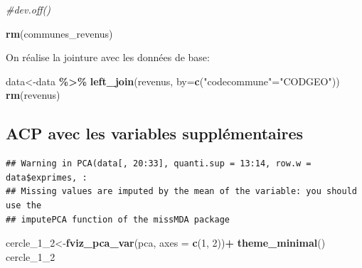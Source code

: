 \documentclass[
]{book}
\newenvironment{Shaded}{\begin{snugshade}}{\end{snugshade}}
\newcommand{\AttributeTok}[1]{\textcolor[rgb]{0.13,0.29,0.53}{#1}}
\newcommand{\CommentTok}[1]{\textcolor[rgb]{0.56,0.35,0.01}{\textit{#1}}}
\newcommand{\ConstantTok}[1]{\textcolor[rgb]{0.56,0.35,0.01}{#1}}
\newcommand{\DecValTok}[1]{\textcolor[rgb]{0.00,0.00,0.81}{#1}}
\newcommand{\FunctionTok}[1]{\textcolor[rgb]{0.13,0.29,0.53}{\textbf{#1}}}
\newcommand{\NormalTok}[1]{#1}
\newcommand{\OtherTok}[1]{\textcolor[rgb]{0.56,0.35,0.01}{#1}}
\newcommand{\SpecialCharTok}[1]{\textcolor[rgb]{0.81,0.36,0.00}{\textbf{#1}}}
\newcommand{\StringTok}[1]{\textcolor[rgb]{0.31,0.60,0.02}{#1}}
\begin{document}
\begin{Shaded}
\begin{Highlighting}[]
\CommentTok{\#dev.off()}

\FunctionTok{rm}\NormalTok{(communes\_revenus)}
\end{Highlighting}
\end{Shaded}

On réalise la jointure avec les données de base:

\begin{Shaded}
\begin{Highlighting}[]
\NormalTok{data}\OtherTok{\textless{}{-}}\NormalTok{data }\SpecialCharTok{\%\textgreater{}\%}
  \FunctionTok{left\_join}\NormalTok{(revenus, }\AttributeTok{by=}\FunctionTok{c}\NormalTok{(}\StringTok{"codecommune"}\OtherTok{=}\StringTok{"CODGEO"}\NormalTok{))}
\FunctionTok{rm}\NormalTok{(revenus)}
\end{Highlighting}
\end{Shaded}

\hypertarget{acp-avec-les-variables-suppluxe9mentaires}{%
\subsection{ACP avec les variables supplémentaires}\label{acp-avec-les-variables-suppluxe9mentaires}}

\begin{Shaded}
\end{Shaded}

\begin{verbatim}
## Warning in PCA(data[, 20:33], quanti.sup = 13:14, row.w = data$exprimes, :
## Missing values are imputed by the mean of the variable: you should use the
## imputePCA function of the missMDA package
\end{verbatim}

\begin{Shaded}
\begin{Highlighting}[]
\NormalTok{cercle\_1\_2}\OtherTok{\textless{}{-}}\FunctionTok{fviz\_pca\_var}\NormalTok{(pca,  }\AttributeTok{axes =} \FunctionTok{c}\NormalTok{(}\DecValTok{1}\NormalTok{, }\DecValTok{2}\NormalTok{))}\SpecialCharTok{+}
  \FunctionTok{theme\_minimal}\NormalTok{()}
\NormalTok{cercle\_1\_2}
\end{Highlighting}
\end{Shaded}
\end{document}
